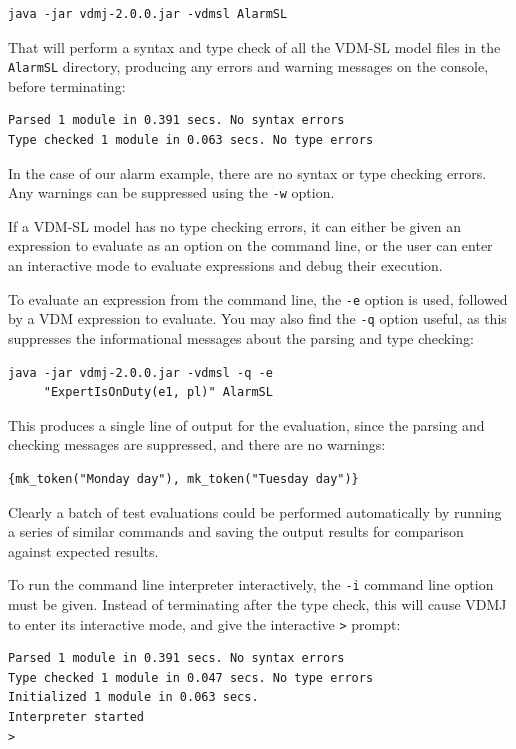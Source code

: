 \begin{lstlisting}
java -jar vdmj-2.0.0.jar -vdmsl AlarmSL
\end{lstlisting}

\noindent That will perform a syntax and type check of all the
VDM-SL model files in the \texttt{AlarmSL} directory, producing any errors and
warning messages on the console, before terminating:

\begin{lstlisting}
Parsed 1 module in 0.391 secs. No syntax errors
Type checked 1 module in 0.063 secs. No type errors
\end{lstlisting}

\noindent In the case of our alarm example, there are no syntax or
type checking errors. Any warnings can be suppressed using the
\verb|-w| option.

If a VDM-SL model has no type checking errors, it can either be given
an expression to evaluate as an option on the command line, or the
user can enter an interactive mode to evaluate expressions and debug
their execution.

To evaluate an expression from the command line, the \verb|-e| option
is used, followed by a VDM expression to evaluate. You may also find
the \verb|-q| option useful, as this suppresses the informational
messages about the parsing and type checking:

\begin{lstlisting}
java -jar vdmj-2.0.0.jar -vdmsl -q -e 
     "ExpertIsOnDuty(e1, pl)" AlarmSL
\end{lstlisting}

\noindent This produces a single line of output for the evaluation,
since the parsing and checking messages are suppressed, and there are
no warnings:

\begin{lstlisting}
{mk_token("Monday day"), mk_token("Tuesday day")}
\end{lstlisting}

Clearly a batch of test evaluations could be performed automatically
by running a series of similar commands and saving the output results
for comparison against expected results.

To run the command line interpreter interactively, the \verb|-i|
command line option must be given. Instead of terminating after the
type check, this will cause VDMJ to enter its interactive mode, and
give the interactive \verb|>| prompt:

\begin{lstlisting}
Parsed 1 module in 0.391 secs. No syntax errors
Type checked 1 module in 0.047 secs. No type errors
Initialized 1 module in 0.063 secs. 
Interpreter started
>
\end{lstlisting}

